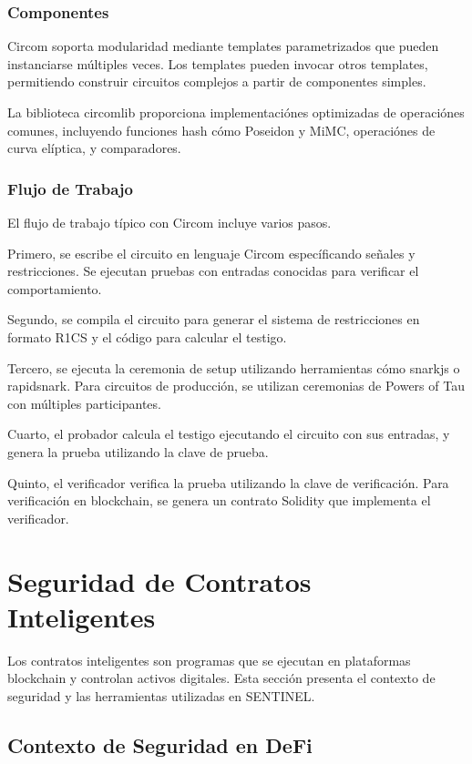 \documentclass[12pt,a4paper,twoside]{book}
\begin{document}
\subsubsection{Componentes}

Circom soporta modularidad mediante templates parametrizados que pueden instanciarse múltiples veces. Los templates pueden invocar otros templates, permitiendo construir circuitos complejos a partir de componentes simples.

La biblioteca circomlib proporciona implementaciónes optimizadas de operaciónes comunes, incluyendo funciones hash cómo Poseidon y MiMC, operaciónes de curva elíptica, y comparadores.

\subsubsection{Flujo de Trabajo}

El flujo de trabajo típico con Circom incluye varios pasos.

Primero, se escribe el circuito en lenguaje Circom específicando señales y restricciones. Se ejecutan pruebas con entradas conocidas para verificar el comportamiento.

Segundo, se compila el circuito para generar el sistema de restricciones en formato R1CS y el código para calcular el testigo.

Tercero, se ejecuta la ceremonia de setup utilizando herramientas cómo snarkjs o rapidsnark. Para circuitos de producción, se utilizan ceremonias de Powers of Tau con múltiples participantes.

Cuarto, el probador calcula el testigo ejecutando el circuito con sus entradas, y genera la prueba utilizando la clave de prueba.

Quinto, el verificador verifica la prueba utilizando la clave de verificación. Para verificación en blockchain, se genera un contrato Solidity que implementa el verificador.

\section{Seguridad de Contratos Inteligentes}

Los contratos inteligentes son programas que se ejecutan en plataformas blockchain y controlan activos digitales. Esta sección presenta el contexto de seguridad y las herramientas utilizadas en SENTINEL.

\subsection{Contexto de Seguridad en DeFi}
\end{document}
